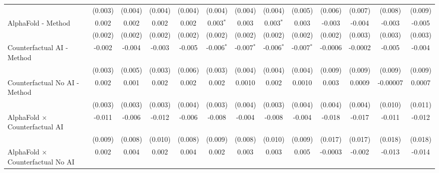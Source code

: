 \begin{tabular}{lcccccccccccc}
                                                              & (0.003)      & (0.004)     & (0.004)      & (0.004)      & (0.004)      & (0.004)        & (0.004)      & (0.005)      & (0.006)       & (0.007) & (0.008)  & (0.009)\\   
   AlphaFold - Method                                         & 0.002        & 0.002       & 0.002        & 0.002        & 0.003$^{*}$  & 0.003          & 0.003$^{*}$  & 0.003        & -0.003        & -0.004  & -0.003   & -0.005\\   
                                                              & (0.002)      & (0.002)     & (0.002)      & (0.002)      & (0.002)      & (0.002)        & (0.002)      & (0.002)      & (0.002)       & (0.003) & (0.003)  & (0.003)\\   
   Counterfactual AI - Method                                 & -0.002       & -0.004      & -0.003       & -0.005       & -0.006$^{*}$ & -0.007$^{*}$   & -0.006$^{*}$ & -0.007$^{*}$ & -0.0006       & -0.0002 & -0.005   & -0.004\\   
                                                              & (0.003)      & (0.005)     & (0.003)      & (0.006)      & (0.003)      & (0.004)        & (0.004)      & (0.004)      & (0.009)       & (0.009) & (0.009)  & (0.009)\\   
   Counterfactual No AI - Method                              & 0.002        & 0.001       & 0.002        & 0.002        & 0.002        & 0.0010         & 0.002        & 0.0010       & 0.003         & 0.0009  & -0.00007 & 0.0007\\   
                                                              & (0.003)      & (0.003)     & (0.003)      & (0.004)      & (0.003)      & (0.004)        & (0.003)      & (0.004)      & (0.004)       & (0.004) & (0.010)  & (0.011)\\   
   AlphaFold $\times$ Counterfactual AI                       & -0.011       & -0.006      & -0.012       & -0.006       & -0.008       & -0.004         & -0.008       & -0.004       & -0.018        & -0.017  & -0.011   & -0.012\\   
                                                              & (0.009)      & (0.008)     & (0.010)      & (0.008)      & (0.009)      & (0.008)        & (0.010)      & (0.009)      & (0.017)       & (0.017) & (0.018)  & (0.018)\\   
   AlphaFold $\times$ Counterfactual No AI                    & 0.002        & 0.004       & 0.002        & 0.004        & 0.002        & 0.003          & 0.003        & 0.005        & -0.0003       & -0.002  & -0.013   & -0.014\\   

\end{tabular}
